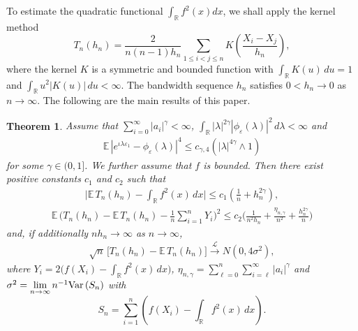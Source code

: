 \documentclass[11pt]{article}
\newtheorem {theorem}{Theorem}[section]
\def\R{{\mathbb R}}
\def\E{{{\mathbb E}\,}}
\def\Var{{\mathop {{\rm Var\, }}}}
\begin{document}
To estimate the quadratic functional $\int_{\R} f^2(x)dx$, we shall apply the kernel method 
\[ 
T_n(h_n)=\frac{2}{n(n-1)h_n} \sum_{1\le i<j\le n}K\left(\frac{X_i-X_j}{h_n}\right),
\]
where the kernel $K$ is a symmetric and bounded function with $\int_{\R} K(u)\, du = 1$ and $\int_{\R} u^2|K(u)|\, du<\infty$. The bandwidth sequence $h_n$ satisfies $0<h_n\to 0$ as $n\to\infty$. The following are the main results of this paper.

\begin{theorem} \label{thm1} 
Assume that $\sum\limits^{\infty}_{i=0} |a_i|^{\gamma}<\infty$, $\int_{\R}|\lambda|^{2\gamma} |\phi_{\varepsilon}(\lambda)|^2\, d\lambda<\infty$ and 
\begin{align}\label{char4moment}
\E|e^{\iota \lambda \varepsilon_1}-\phi_{\varepsilon}(\lambda)|^{4}\leq c_{\gamma,4} \left(|\lambda|^{4\gamma}\wedge 1\right)
\end{align}
for some $\gamma\in(0,1]$. We further assume that $f$ is bounded. Then there exist positive constants $c_1$ and $c_2$ such that
\begin{align} \label{r1}
\Big|\E T_n(h_n)-\int_{\R} f^2(x)\, dx \Big|\leq c_1\left(\frac{1}{n}+h^{2\gamma}_n\right),
\end{align}
\begin{align}  \label{r2}
\E\Big(T_n(h_n)-\E T_n(h_n)-\frac{1}{n}\sum^n_{i=1}Y_i\Big)^2 \leq c_2 \Big(\frac{1}{n^2h_n}+\frac{\eta_{n,\gamma}}{n^2}+\frac{h^{2\gamma}_n}{n}\Big)
\end{align}
and, if additionally $nh_n\to \infty$ as $n\to\infty$,
\begin{align} \label{r3}
\sqrt{n}\, \Big[T_n(h_n)-\E T_n(h_n)\Big]\overset{\mathcal{L}}{\longrightarrow} N(0,4\sigma^2),
\end{align}
where $Y_i=2\big(f(X_i)-\int_{\R} f^2(x)\, dx\big)$, $\eta_{n,\gamma}=\sum\limits^{n}_{\ell=0}\sum\limits^{\infty}_{i=\ell} |a_i|^{\gamma}$
and $\sigma^2=\lim\limits_{n\to\infty} n^{-1}\Var(S_n)$ with 
\[
S_n=\sum\limits^n_{i=1}\left(f(X_i)-\int_{\R} f^2(x)\, dx\right).
\]
\end{theorem}
\end{document}
